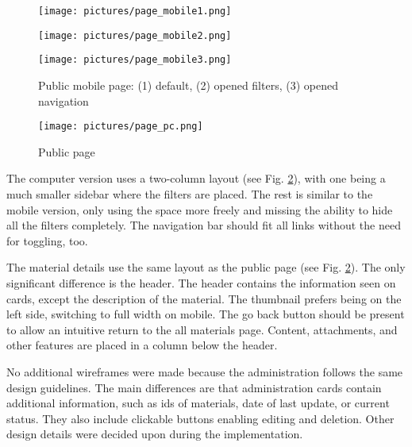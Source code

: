\documentclass[
  digital,     %
  oneside,     %
  nosansbold,  %
  colorbold, %
  lof,         %
  lot,         %
]{fithesis4}
\newcommand{\imgref}[1]{(see Fig. \ref{fig:#1})}
\begin{document}
\begin{figure}[!htbp]
	\begin{center}
		\begin{minipage}{.25\textwidth}
			\texttt{[image: pictures/page\_mobile1.png]}
		\end{minipage}
		\hfill
		\begin{minipage}{.25\textwidth}
			\texttt{[image: pictures/page\_mobile2.png]}
		\end{minipage}
		\hfill
		\begin{minipage}{.25\textwidth}
			\texttt{[image: pictures/page\_mobile3.png]}
		\end{minipage}
	\end{center}
	\caption{Public mobile page: (1) default, (2) opened filters, (3) opened navigation}
	\label{fig:page-mobile}
\end{figure}

\begin{figure}[!htpb]
	\begin{center}
		\begin{minipage}{.9\textwidth}
			\texttt{[image: pictures/page\_pc.png]}
		\end{minipage}
	\end{center}
	\caption{Public page}
	\label{fig:page-pc}
\end{figure}

The computer version uses a two-column layout \imgref{page-pc}, with one being a much smaller
sidebar where the filters are placed. The rest is similar to the mobile version, only using the space
more freely and missing the ability to hide all the filters completely. The navigation bar should fit all
links without the need for toggling, too.

The material details use the same layout as the public page \imgref{page-pc}. The only significant
difference is the header. The header contains the information seen on cards, except the description of
the material. The thumbnail prefers being on the left side, switching to full width on mobile. The go
back button should be present to allow an intuitive return to the all materials page. Content,
attachments, and other features are placed in a column below the header.

No additional wireframes were made because the administration follows the same design guidelines.
The main differences are that administration cards contain additional information, such as ids of
materials, date of last update, or current status. They also include clickable buttons enabling editing
and deletion. Other design details were decided upon during the implementation.
\end{document}
